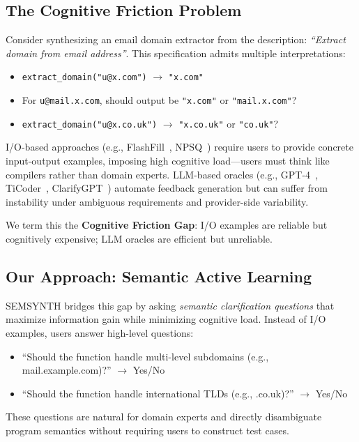 \documentclass[10pt,conference]{IEEEtran}
\begin{document}
\subsection{The Cognitive Friction Problem}
Consider synthesizing an email domain extractor from the description: \textit{``Extract domain from email address''}. This specification admits multiple interpretations:
\begin{itemize}
  \item \texttt{extract\_domain("u@x.com")} $\to$ \texttt{"x.com"}
  \item For \texttt{u@mail.x.com}, should output be \texttt{"x.com"} or \texttt{"mail.x.com"}?
  \item \texttt{extract\_domain("u@x.co.uk")} $\to$ \texttt{"x.co.uk"} or \texttt{"co.uk"}?
\end{itemize}

I/O-based approaches (e.g., FlashFill~\cite{flashfill}, NPSQ~\cite{npsq}) require users to provide concrete input-output examples, imposing high cognitive load---users must think like compilers rather than domain experts. LLM-based oracles (e.g., GPT-4~\cite{gpt4}, TiCoder~\cite{ticoder}, ClarifyGPT~\cite{clarifygpt}) automate feedback generation but can suffer from instability under ambiguous requirements and provider-side variability.

We term this the \textbf{Cognitive Friction Gap}: I/O examples are reliable but cognitively expensive; LLM oracles are efficient but unreliable.

\subsection{Our Approach: Semantic Active Learning}
SEMSYNTH bridges this gap by asking \textit{semantic clarification questions} that maximize information gain while minimizing cognitive load. Instead of I/O examples, users answer high-level questions:
\begin{itemize}
  \item ``Should the function handle multi-level subdomains (e.g., mail.example.com)?'' $\to$ Yes/No
  \item ``Should the function handle international TLDs (e.g., .co.uk)?'' $\to$ Yes/No
\end{itemize}
These questions are natural for domain experts and directly disambiguate program semantics without requiring users to construct test cases.
\end{document}
